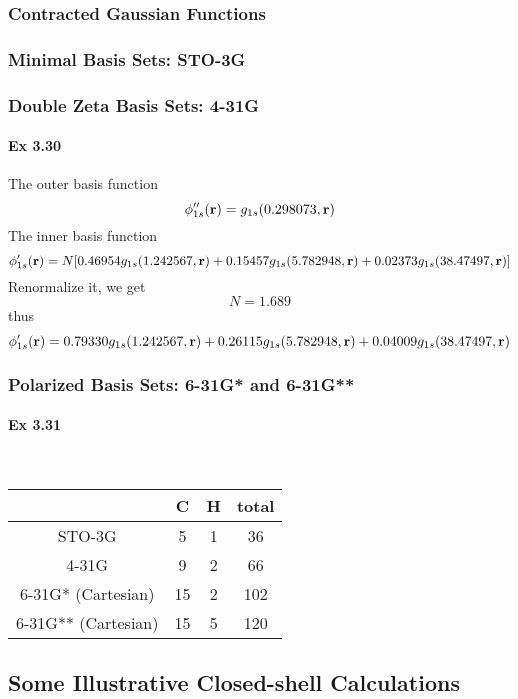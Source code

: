 \documentclass[a4paper]{article}
\newcommand{\ex}[1]{\paragraph{Ex #1}}
\numberwithin{equation}{subsection}
\begin{document}
\subsubsection{Contracted Gaussian Functions}
\subsubsection{Minimal Basis Sets: STO-3G}
\subsubsection{Double Zeta Basis Sets: 4-31G}
\ex{3.30}
The outer basis function
\begin{equation}\label{key}
\phi''_{1s}(\vb{r}) = g_{1s}(0.298073, \vb{r})
\end{equation}
The inner basis function
\begin{equation}\label{key}
\phi'_{1s}(\vb{r}) = N[0.46954 g_{1s}(1.242567, \vb{r}) 
+ 0.15457 g_{1s}(5.782948, \vb{r}) + 0.02373 g_{1s}(38.47497, \vb{r})]
\end{equation}
Renormalize it, we get
\begin{equation}\label{key}
N = 1.689
\end{equation}
thus
\begin{equation}\label{key}
\phi'_{1s}(\vb{r}) = 0.79330 g_{1s}(1.242567, \vb{r}) 
+ 0.26115 g_{1s}(5.782948, \vb{r}) + 0.04009 g_{1s}(38.47497, \vb{r})
\end{equation}

\subsubsection{Polarized Basis Sets: 6-31G* and 6-31G**}
\ex{3.31}
~\\
\begin{table}[H]
	\centering
	\begin{tabular}{cccc}
		\hline
		 & C & H & total\\ \hline
		STO-3G & 5 & 1 & 36\\
		4-31G & 9 & 2 & 66\\
		6-31G* (Cartesian) & 15 & 2 & 102\\
		6-31G** (Cartesian) & 15 & 5 & 120\\
		\hline
	\end{tabular}
\end{table}

\subsection{Some Illustrative Closed-shell Calculations}
\end{document}
